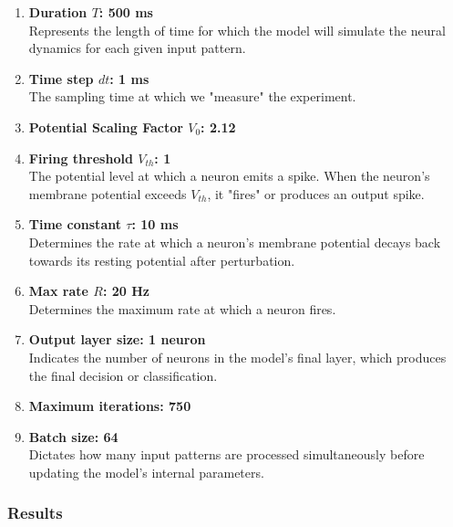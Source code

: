\begin{enumerate}
    \item \textbf{Duration \( T \): 500 ms} \\
    Represents the length of time for which the model will simulate the neural dynamics for each given input pattern.
    
    \item \textbf{Time step \( dt \): 1 ms} \\
    The sampling time at which we "measure" the experiment.
    
    \item \textbf{Potential Scaling Factor \( V_0 \): 2.12} 
    
    \item \textbf{Firing threshold \( V_{th} \): 1} \\
    The potential level at which a neuron emits a spike. When the neuron's membrane potential exceeds $V_{th}$, it "fires" or produces an output spike.
    
    \item \textbf{Time constant \( \tau \): 10 ms} \\
    Determines the rate at which a neuron's membrane potential decays back towards its resting potential after perturbation.

    \item \textbf{Max rate \( R \): 20 Hz} \\
    Determines the maximum rate at which a neuron fires.
    
    \item \textbf{Output layer size: 1 neuron} \\
    Indicates the number of neurons in the model's final layer, which produces the final decision or classification.
    
    \item \textbf{Maximum iterations: 750} 

    \item \textbf{Batch size: 64} \\
    Dictates how many input patterns are processed simultaneously before updating the model's internal parameters. 

\end{enumerate}

\subsubsection{Results}

